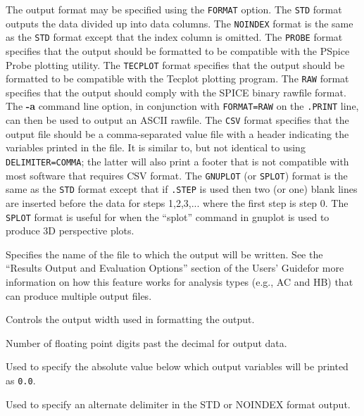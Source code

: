 \begin{Command}
\begin{Arguments}
The output format may be specified using the \texttt{FORMAT} option.
The \texttt{STD} format outputs the data divided up into data columns.
The \texttt{NOINDEX} format is the same as the \texttt{STD} format
except that the index column is omitted. The \texttt{PROBE} format
specifies that the output should be formatted to be compatible with the
 PSpice Probe plotting utility.  The
\texttt{TECPLOT} format specifies that the output should be formatted to
be compatible with the Tecplot plotting program.  The \texttt{RAW}
format specifies that the output should comply with the SPICE binary
rawfile format.  The {\bf -a} command line option, in conjunction with
\texttt{FORMAT=RAW} on the \texttt{.PRINT} line, can then be used to output an
ASCII rawfile.  The \texttt{CSV} format specifies that the output file
should be a comma-separated value file with a header indicating the
variables printed in the file.  It is similar to, but not identical to
using \texttt{DELIMITER=COMMA}; the latter will also print a footer that
is not compatible with most software that requires CSV format.  The \texttt{GNUPLOT}
(or \texttt{SPLOT}) format is the same as the \texttt{STD} format except
that if \texttt{.STEP} is used then two (or one) blank lines are inserted
before the data for steps 1,2,3,... where the first step is step 0. The
\texttt{SPLOT} format is useful for when the ``splot'' command in gnuplot
is used to produce 3D perspective plots.


Specifies the name of the file to which the output will be written.
See the ``Results Output and Evaluation Options'' section of the 
\Xyce{} Users' Guide\UsersGuide for more information on how this
feature works for analysis types (e.g., AC and HB) that can produce 
multiple output files. 


Controls the output width used in formatting the output.


Number of floating point digits past the decimal for output data.


Used to specify the absolute value below which output variables will be
printed as \texttt{0.0}.


Used to specify an alternate delimiter in the STD or NOINDEX format
output.


\end{Arguments}
\end{Command}
